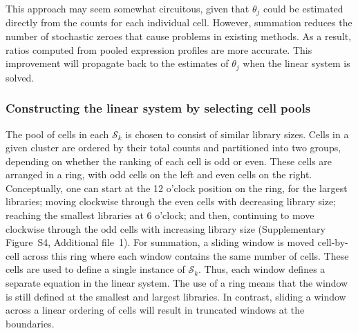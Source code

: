 \documentclass{bmcart}
\newcommand{\suppring}{S4}
\begin{document}
This approach may seem somewhat circuitous, given that $\theta_j$ could be estimated directly from the counts for each individual cell.
However, summation reduces the number of stochastic zeroes that cause problems in existing methods.
As a result, ratios computed from pooled expression profiles are more accurate.
This improvement will propagate back to the estimates of $\theta_j$ when the linear system is solved.

\subsubsection*{Constructing the linear system by selecting cell pools}
The pool of cells in each $\mathcal{S}_{k}$ is chosen to consist of similar library sizes.
Cells in a given cluster are ordered by their total counts and partitioned into two groups, depending on whether the ranking of each cell is odd or even.
These cells are arranged in a ring, with odd cells on the left and even cells on the right.
Conceptually, one can start at the 12 o'clock position on the ring, for the largest libraries; moving clockwise through the even cells with decreasing library size;
reaching the smallest libraries at 6 o'clock; and then, continuing to move clockwise through the odd cells with increasing library size (Supplementary Figure~\suppring{}, Additional file~1).
For summation, a sliding window is moved cell-by-cell across this ring where each window contains the same number of cells.
These cells are used to define a single instance of $\mathcal{S}_{k}$.
Thus, each window defines a separate equation in the linear system.
The use of a ring means that the window is still defined at the smallest and largest libraries.
In contrast, sliding a window across a linear ordering of cells will result in truncated windows at the boundaries.
\end{document}
